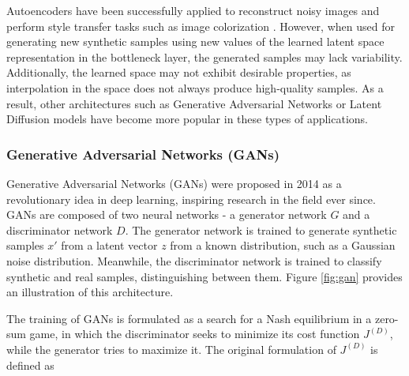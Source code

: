 Autoencoders have been successfully applied to reconstruct noisy images \cite{conf/icml/VincentLBM08} and perform style transfer tasks such as image colorization \cite{zhang2016colorful}. However, when used for generating new synthetic samples using new values of the learned latent space representation in the bottleneck layer, the generated samples may lack variability. Additionally, the learned space may not exhibit desirable properties, as interpolation in the space does not always produce high-quality samples. As a result, other architectures such as Generative Adversarial Networks \cite{NIPS2014_5ca3e9b1} or Latent Diffusion models have become more popular in these types of applications.

\subsubsection{Generative Adversarial Networks (GANs)}




Generative Adversarial Networks (GANs) \cite{NIPS2014_5ca3e9b1} were proposed in 2014 as a revolutionary idea in deep learning, inspiring research in the field ever since. GANs are composed of two neural networks - a generator network $G$ and a discriminator network $D$. The generator network is trained to generate synthetic samples $x'$ from a latent vector $z$ from a known distribution, such as a Gaussian noise distribution. Meanwhile, the discriminator network is trained to classify synthetic and real samples, distinguishing between them. Figure \ref{fig:gan} provides an illustration of this architecture.

The training of GANs is formulated as a search for a Nash equilibrium in a zero-sum game, in which the discriminator seeks to minimize its cost function $J^{(D)}$, while the generator tries to maximize it. The original formulation of $J^{(D)}$ is defined as

